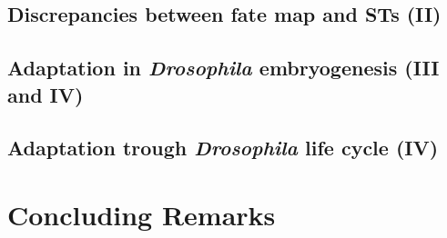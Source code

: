\documentclass[officiallayout]{tktla_modified}
\begin{document}
\section{Discrepancies between fate map and STs (II)}
	

\section{Adaptation in \textit{Drosophila} embryogenesis (III and IV)}
	
\section{Adaptation trough \textit{Drosophila} life cycle (IV)}
	
	\clearpage




\chapter{Concluding Remarks}

\clearpage

%

\begin{multicols}{2}
{\footnotesize

}
\end{multicols}

\end{document}
